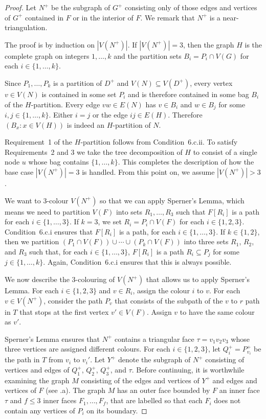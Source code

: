 \documentclass{patmorin}
\begin{document}
\begin{proof}
  Let $N^+$ be the subgraph of $G^+$ consisting only of those edges and vertices of $G^+$ contained in $F$ or in the interior of $F$.
  We remark that $N^+$ is a near-triangulation. 
  
  The proof is by induction on $|V(N^+)|$.  If $|V(N^+)| = 3$, then the graph $H$ is the complete graph on integers $1,\ldots,k$ and the partition sets $B_{i}=P_i\cap V(G)$ for each $i\in\{1,\ldots,k\}$.  
  
  Since $P_1,\ldots,P_k$ is a partition of $D^+$ and $V(N)\subseteq V(D^+)$, every vertex $v\in V(N)$ is contained in some set $P_i$ and is therefore contained in some bag $B_{i}$ of the $H$-partition.  Every edge $vw\in E(N)$ has $v\in B_{i}$ and $w\in B_{j}$ for some $i,j\in\{1,\ldots,k\}$. Either $i=j$ or the edge $ij\in E(H)$.  Therefore $(B_x : x\in V(H))$ is indeed an $H$-partition of $N$.
  
  Requirement~1 of the $H$-partition follows from Condition~6.c.ii.  To satisfy Requirements~2 and 3 we take the tree decomposition of $H$ to consist of a single node $u$ whose bag contains $\{1,\ldots,k\}$.  This completes the description of how the base case $|V(N^+)|=3$ is handled. From this point on, we assume $|V(N^+)|> 3$.
  
  We want to 3-colour $V(N^+)$ so that we can apply Sperner's Lemma, which means we need to partition $V(F)$ into sets $R_1,\ldots,R_3$ such that $F[R_i]$ is a path for each $i\in\{1,\ldots,3\}$.
  If $k=3$, we set $R_i=P_i\cap V(F)$ for each $i\in\{1,2,3\}$.  Condition~6.c.i ensures that $F[R_i]$ is a path, for each $i\in\{1,\ldots,3\}$.  If $k\in\{1,2\}$, then we partition $(P_1\cap V(F))\cup\cdots\cup(P_k\cap V(F))$ into three sets $R_1$, $R_2$, and $R_3$ such that, for each $i\in\{1,\ldots,3\}$, $F[R_i]$ is a path $R_i\subseteq P_j$ for some $j\in\{1,\ldots,k\}$. Again, Condition~6.c.i ensures that this is always possible.
  
  We now describe the 3-colouring of $V(N^+)$ that allows us to apply Sperner's Lemma. For each $i\in\{1,2,3\}$ and $v\in R_i$, assign the colour $i$ to $v$.
  For each $v\in V(N^+)$, consider the path $P_v$ that consists of the subpath of the $v$ to $r$ path in $T$ that stops at the first vertex $v'\in V(F)$. Assign $v$ to have the same colour as $v'$.
  
  Sperner's Lemma ensures that $N^+$ contains a triangular face $\tau=v_1v_2v_3$ whose three vertices are assigned different colours. For each $i\in\{1,2,3\}$, let $Q_i^+=P_{v_i}^+$ be the path in $T$ from $v_i$ to $v_i'$.  Let $Y^+$ denote the subgraph of $N^+$ consisting of vertices and edges of $Q_1^+$, $Q_2^+$, $Q_3^+$, and $\tau$.  Before continuing, it is worthwhile examining the graph $M$ consisting of the edges and vertices of $Y^+$ and edges and vertices of $F$ (see .a).  The graph $M$ has an outer face bounded by $F$ an inner face $\tau$ and $f\le 3$ inner faces $F_1,\ldots,F_f$, that are labelled so that each $F_i$ does not contain any vertices of $P_i$ on its boundary.  
  

\end{proof}
\end{document}
